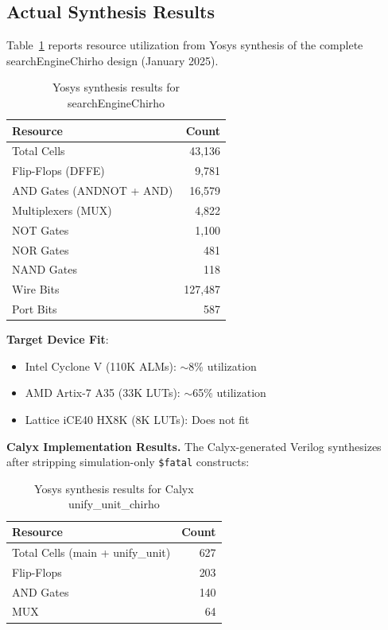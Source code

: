 \documentclass[11pt,a4paper]{article}
\begin{document}
\subsection{Actual Synthesis Results}
\label{subsec:actual_synthesis_chirho}

Table~\ref{tab:yosys_results_chirho} reports resource utilization from Yosys
synthesis of the complete searchEngineChirho design (January 2025).

\begin{table}[ht]
\centering
\caption{Yosys synthesis results for searchEngineChirho}
\label{tab:yosys_results_chirho}
\begin{tabular}{lr}
\toprule
\textbf{Resource} & \textbf{Count} \\
\midrule
Total Cells & 43,136 \\
Flip-Flops (DFFE) & 9,781 \\
AND Gates (ANDNOT + AND) & 16,579 \\
Multiplexers (MUX) & 4,822 \\
NOT Gates & 1,100 \\
NOR Gates & 481 \\
NAND Gates & 118 \\
Wire Bits & 127,487 \\
Port Bits & 587 \\
\bottomrule
\end{tabular}
\end{table}

\textbf{Target Device Fit}:
\begin{itemize}
  \item Intel Cyclone V (110K ALMs): $\sim$8\% utilization
  \item AMD Artix-7 A35 (33K LUTs): $\sim$65\% utilization
  \item Lattice iCE40 HX8K (8K LUTs): Does not fit
\end{itemize}

\textbf{Calyx Implementation Results.}
The Calyx-generated Verilog synthesizes after stripping simulation-only
\texttt{\$fatal} constructs:

\begin{table}[ht]
\centering
\caption{Yosys synthesis results for Calyx unify\_unit\_chirho}
\label{tab:calyx_results_chirho}
\begin{tabular}{lr}
\toprule
\textbf{Resource} & \textbf{Count} \\
\midrule
Total Cells (main + unify\_unit) & 627 \\
Flip-Flops & 203 \\
AND Gates & 140 \\
MUX & 64 \\
\bottomrule
\end{tabular}
\end{table}
\end{document}
